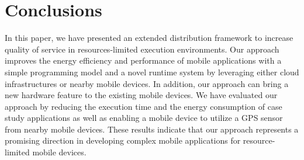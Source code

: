 \documentclass{sig-alternate}[10pt]
\begin{document}
\section{Conclusions}
\label{sec:conc}
%
In this paper, we have presented an extended distribution framework to increase quality of service in resources-limited execution environments. Our approach improves the energy efficiency and performance of mobile applications with a simple programming model and a novel runtime system by leveraging either cloud infrastructures or nearby mobile devices. In addition, our approach can bring a new hardware feature to the existing mobile devices. We have evaluated our approach by reducing the execution time and the energy consumption of case study applications as well as enabling a mobile device to utilize a GPS sensor from nearby mobile devices. These results indicate that our approach represents a promising direction in developing complex mobile applications for resource-limited mobile devices.


\balance


\end{document}
